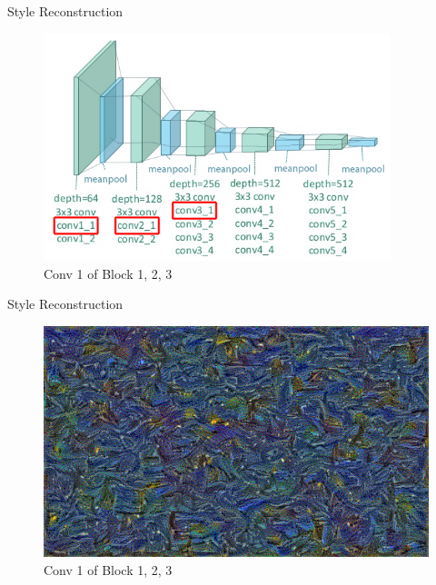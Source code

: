 \documentclass{beamer}
\begin{document}
\begin{frame}{Style Reconstruction}
\begin{figure}[ht]
\centering
\caption{Conv 1 of Block 1, 2, 3}
\includegraphics[width=0.9\textwidth]{img/vgg19/style/block3_conv1}
\end{figure}
\end{frame}
\begin{frame}{Style Reconstruction}
\begin{figure}[ht]
\centering
\caption{Conv 1 of Block 1, 2, 3}
\includegraphics[width=\textwidth]{img/style/block3_conv1.png}
\end{figure}
\end{frame}
\end{document}
